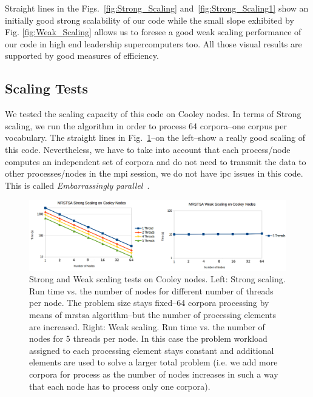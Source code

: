 \documentclass[11pt,a4paper]{article}
\begin{document}
Straight lines in the Figs.~\ref{fig:Strong_Scaling} and~\ref{fig:Strong_Scaling1} show an initially good strong scalability of our code while the small slope exhibited by Fig. \ref{fig:Weak_Scaling} allows us to foresee a good weak scaling performance of our code in high end leadership supercomputers too. All those visual results are supported by good measures of efficiency.




















\subsection{ Scaling Tests}

We tested the scaling capacity of this code on Cooley nodes. In terms of Strong scaling, we run the algorithm in order to process 64 corpora--one corpus per vocabulary. The straight lines in Fig.~\ref{fig:MRSTSA_Scaling}--on the left--show a really good scaling of this code. Nevertheless, we have to take into account that each process/node computes an independent set of corpora and do not need to transmit the data to other processes/nodes in the \gls{mpi} session, we do not have \gls{ipc} issues in this code. This is called \emph{Embarrassingly parallel}~\cite{noauthor_embarrassingly_2018}. 

\begin{figure}[h!]
    \centering
    \includegraphics[width=1.0\textwidth]{MRSTSA_Scaling.png}
    \caption{Strong and Weak scaling tests on Cooley nodes. Left: Strong scaling. Run time vs. the number of nodes for different number of threads per node. The problem size stays fixed--64 corpora processing by means of \gls{mrstsa} algorithm--but the number of processing elements are increased. Right: Weak scaling. Run time vs. the number of nodes for 5 threads per node. In this case the problem workload assigned to each processing element stays constant and additional elements are used to solve a larger total problem (i.e. we add more corpora for process as the number of nodes increases in such a way that each node has to process only one corpora).}
    \label{fig:MRSTSA_Scaling}
\end{figure}
\end{document}
